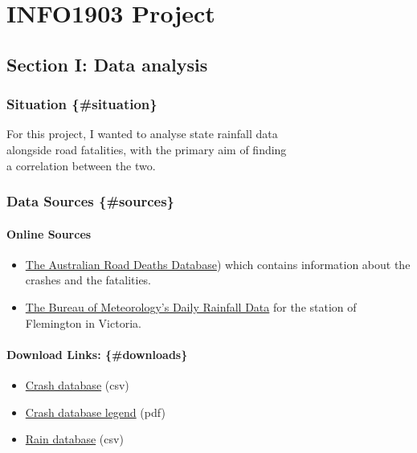 \documentclass{article}
\begin{document}
\section{INFO1903 Project}\label{info1903-project}

\subsection{Section I: Data analysis}\label{section-i-data-analysis}

\subsubsection{Situation \{\#situation\}}\label{situation-situation}

For this project, I wanted to analyse state rainfall data\\
alongside road fatalities, with the primary aim of finding\\
a correlation between the two.

\subsubsection{Data Sources \{\#sources\}}\label{data-sources-sources}

\paragraph{Online Sources}\label{online-sources}

\begin{itemize}
\tightlist
\item
  \href{http://data.gov.au/dataset/australian-road-deaths-database/resource/ca07c8e3-672f-4826-a6e5-83fd7127ae0b}{The
  Australian Road Deaths Database}) which contains information about the
  crashes and the fatalities.
\item
  \href{http://www.bom.gov.au/jsp/ncc/cdio/weatherData/av?p_nccObsCode=136\&p_display_type=dailyDataFile\&p_startYear=\&p_c=\&p_stn_num=086039}{The
  Bureau of Meteorology's Daily Rainfall Data} for the station of
  Flemington in Victoria.
\end{itemize}

\paragraph{Download Links:
\{\#downloads\}}\label{download-links-downloads}

\begin{itemize}
\tightlist
\item
  \href{https://bitre.gov.au/statistics/safety/files/Fatal_Crashes_Feb2017.csv}{Crash
  database} (csv)
\item
  \href{https://bitre.gov.au/statistics/safety/files/ARDD_Dictionary_V3.pdf}{Crash
  database legend} (pdf)
\item
  \href{http://www.bom.gov.au/jsp/ncc/cdio/weatherData/av?p_display_type=dailyZippedDataFile\&p_stn_num=086039\&p_c=-1480557288\&p_nccObsCode=136\&p_startYear=2017}{Rain
  database} (csv)
\end{itemize}
\end{document}
